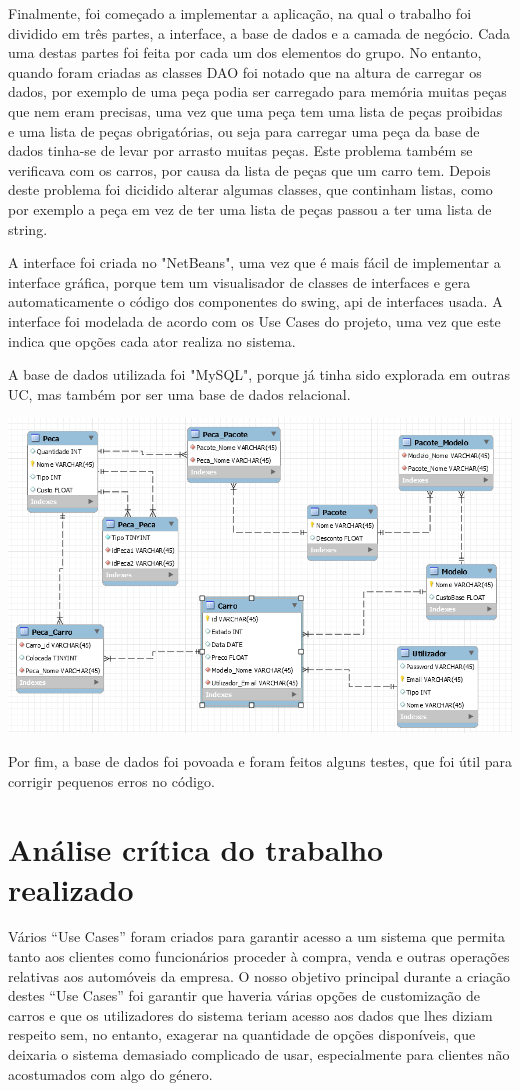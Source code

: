 \documentclass[10pt, a4paper]{article}
\begin{document}
Finalmente, foi começado a implementar a aplicação, na qual o trabalho foi dividido em três partes, a interface, a base de dados e a camada de negócio. Cada uma destas partes foi feita por cada um dos elementos do grupo. No entanto, quando foram criadas as classes DAO foi notado que na altura de carregar os dados, por exemplo de uma peça podia ser carregado para memória muitas peças que nem eram precisas, uma vez que uma peça tem uma lista de peças proibidas e uma lista de peças obrigatórias, ou seja para carregar uma peça da base de dados tinha-se de levar por arrasto muitas peças. Este problema também se verificava com os carros, por causa da lista de peças que um carro tem. Depois deste problema foi dicidido alterar algumas classes, que continham listas, como por exemplo a peça em vez de ter uma lista de peças passou a ter uma lista de string.

A interface foi criada no "NetBeans", uma vez que é mais fácil de implementar a interface gráfica, porque tem um visualisador de classes de interfaces e gera automaticamente o código dos componentes do swing, api de interfaces usada. A interface foi modelada de acordo com os Use Cases do projeto, uma vez que este indica que opções cada ator realiza no sistema.

A base de dados utilizada foi  "MySQL", porque já tinha sido explorada em outras UC, mas também por ser uma base de dados relacional.

\includegraphics{EsquemaFisico}

Por fim, a base de dados foi povoada e foram feitos alguns testes, que foi útil para corrigir pequenos erros no código.

\newpage
\section{Análise crítica do trabalho realizado}\label{analise}
Vários “Use Cases” foram criados para garantir acesso a um sistema que permita tanto aos clientes como funcionários proceder à compra, venda e outras operações relativas aos automóveis da empresa. O nosso objetivo principal durante a criação destes “Use Cases” foi garantir que haveria várias opções de customização de carros e que os utilizadores do sistema teriam acesso aos dados que lhes diziam respeito sem, no entanto, exagerar na quantidade de opções disponíveis, que deixaria o sistema demasiado complicado de usar, especialmente para clientes não acostumados com algo do género.
\end{document}
